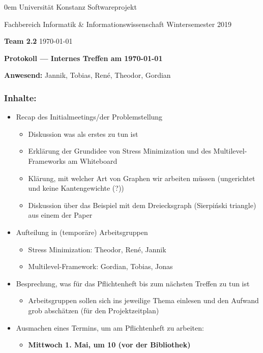 \documentclass[11pt]{article} %
\newcommand{\names}{Team 2.2}
\begin{document}
\thispagestyle{plain}
{\footnotesize \parindent0em
    {\sc Universität Konstanz} \hfill {\sc Softwareprojekt}\par
    {\sc Fachbereich Informatik \& Informationswissenschaft} \hfill Wintersemester 2019 \par
    \textbf{\names} \hfill \today\par
    \begin{center}
      {\Large\bf Protokoll --- Internes Treffen am \today}
    \end{center}}
  \par{\textbf{Anwesend:}} Jannik, Tobias, René, Theodor, Gordian
\subsubsection*{Inhalte:}
  \begin{itemize}
  \item Recap des Initialmeetings/der Problemstellung
    \begin{itemize}
    \item Diskussion was als erstes zu tun ist
    \item Erklärung der Grundidee von Stress Minimization und
      des Multilevel-Frameworks am Whiteboard
    \item Klärung, mit welcher Art von Graphen wir arbeiten müssen
      (ungerichtet und keine Kantengewichte (?))
    \item Diskussion über das Beispiel mit dem Dreiecksgraph (Sierpiński triangle) aus einem der Paper
    \end{itemize}
  \item Aufteilung in (temporäre) Arbeitsgruppen
    \begin{itemize}
    \item Stress Minimization: Theodor, René, Jannik
    \item Multilevel-Framework: Gordian, Tobias, Jonas
    \end{itemize}
  \item Besprechung, was für das Pflichtenheft bis zum nächsten Treffen zu tun ist
    \begin{itemize}
    \item Arbeitsgruppen sollen sich ins jeweilige Thema einlesen und den Aufwand grob abschätzen (für den Projektzeitplan)
    \end{itemize}
  \item Ausmachen eines Termins, um am Pflichtenheft zu arbeiten:
    \begin{itemize}
    \item {\large \bf Mittwoch 1. Mai, um 10 (vor der Bibliothek)}
    \end{itemize}
  \end{itemize}  
\end{document}
